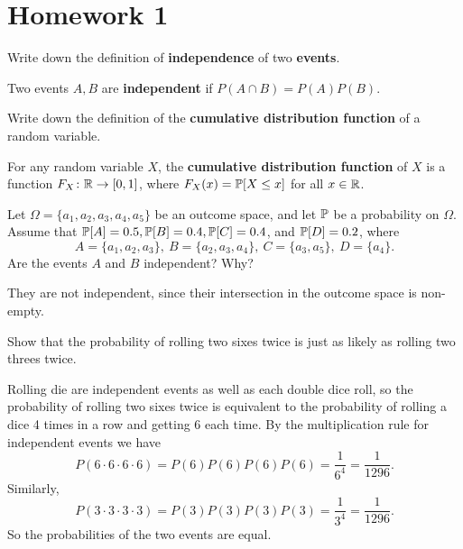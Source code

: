 \section{Homework 1} 

\begin{prob}
   Write down the definition of \textbf{independence} of two \textbf{events}.  
\end{prob}
\begin{solution}
    Two events $A,B$ are \textbf{independent} if $P(A\cap B)=P(A)P(B)$.
\end{solution}
\begin{prob}
    Write down the definition of the \textbf{cumulative distribution function} of a random variable.
\end{prob}
\begin{solution}
        For any random variable $X$, the \textbf{cumulative distribution function} of $X$ is a function $F_X \colon \R \to [0,1] $, where $F_X (x) = \P[X \leq x]$ for all $x \in \R$.
\end{solution}

\begin{prob}
    Let $\Omega= \{a_1,a_2,a_3,a_4,a_5\} $ be an outcome space, and let $\P$ be a probability on $\Omega$. Assume that $\P[A] = 0.5, \P [B] = 0.4, \P[C]=0.4$, and $\P [D]=0.2$, where \[
    A = \{a_1,a_2,a_3\},\ B=\{a_2,a_3,a_4\},\ C =\{a_3,a_5\} ,\ D=\{a_4\} .
    \] Are the events $A$ and $B$ independent? Why?
\end{prob}
\begin{solution}
    They are not independent, since their intersection in the outcome space is non-empty.
\end{solution}

\begin{prob}
Show that the probability of rolling two sixes twice is just as likely as rolling two threes twice.    
\end{prob}
\begin{solution}
    Rolling die are independent events as well as each double dice roll, so the probability of rolling two sixes twice is equivalent to the probability of rolling a dice 4 times in a row and getting 6 each time. By the multiplication rule for independent events we have \[
        P(6 \cdot 6 \cdot  6 \cdot  6)=P(6)P(6)P(6)P(6)=\frac{1}{6^4}=\frac{1}{1296}.
    \] Similarly, \[
        P(3 \cdot 3 \cdot  3 \cdot  3)=P(3)P(3)P(3)P(3)=\frac{1}{3^4}=\frac{1}{1296}.
    \] So the probabilities of the two events are equal.
\end{solution}

